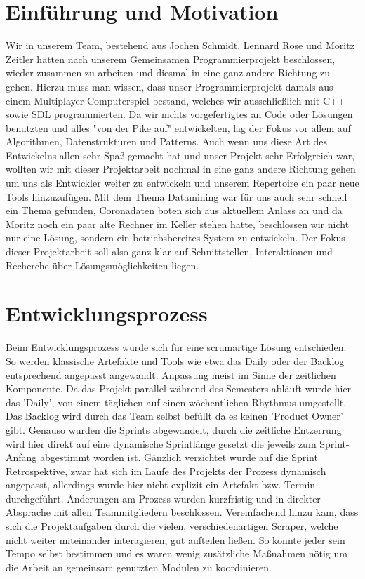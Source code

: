 \documentclass[12pt,oneside,a4paper,parskip]{scrbook}
\begin{document}
\chapter{Einführung und Motivation}\label{ch:intro}
Wir in unserem Team, bestehend aus Jochen Schmidt, Lennard Rose und Moritz Zeitler hatten nach unserem Gemeinsamen Programmierprojekt beschlossen, wieder zusammen zu arbeiten und diesmal in eine ganz andere Richtung zu gehen. Hierzu muss man wissen, dass unser Programmierprojekt damals aus einem Multiplayer-Computerspiel bestand, welches wir ausschließlich mit C++ sowie SDL programmierten. Da wir nichts vorgefertigtes an Code oder Lösungen benutzten und alles "von der Pike auf"  entwickelten, lag der Fokus vor allem auf Algorithmen, Datenstrukturen und Patterns. Auch wenn uns diese Art des Entwickelns allen sehr Spaß gemacht hat und unser Projekt sehr Erfolgreich war, wollten wir mit dieser Projektarbeit nochmal in eine ganz andere Richtung gehen um uns als Entwickler weiter zu entwickeln und unserem Repertoire ein paar neue Tools hinzuzufügen. Mit dem Thema Datamining war für uns auch sehr schnell ein Thema gefunden, Coronadaten boten sich aus aktuellem Anlass an und da Moritz noch ein paar alte Rechner im Keller stehen hatte, beschlossen wir nicht nur eine Lösung, sondern ein betriebsbereites System zu entwickeln. \newline
Der Fokus dieser Projektarbeit soll also ganz klar auf Schnittstellen, Interaktionen und Recherche über Lösungsmöglichkeiten liegen.

\chapter{Entwicklungsprozess}
Beim Entwicklungsprozess wurde sich f\"ur eine scrumartige L\"osung entschieden. So werden klassische Artefakte und Tools wie etwa das Daily oder der Backlog entsprechend angepasst angewandt. Anpassung meist im Sinne der zeitlichen Komponente. Da das Projekt parallel w\"ahrend des Semesters abl\"auft wurde hier das 'Daily', von einem t\"aglichen auf einen w\"ochentlichen Rhythmus umgestellt. Das Backlog wird durch das Team selbst bef\"ullt da es keinen 'Product Owner' gibt. Genauso wurden die Sprints abgewandelt, durch die zeitliche Entzerrung wird hier direkt auf eine dynamische Sprintl\"ange gesetzt die jeweils zum Sprint-Anfang abgestimmt worden ist. \newline
G\"anzlich verzichtet wurde auf die Sprint Retrospektive, zwar hat sich im Laufe des Projekts der Prozess dynamisch angepasst, allerdings wurde hier nicht explizit ein Artefakt bzw. Termin durchgef\"uhrt. \"Anderungen am Prozess wurden kurzfristig und in direkter Absprache mit allen Teammitgliedern beschlossen. Vereinfachend hinzu kam, dass sich die Projektaufgaben durch die vielen, verschiedenartigen Scraper, welche nicht weiter miteinander interagieren, gut aufteilen ließen. So konnte jeder sein Tempo selbst bestimmen und es waren wenig zusätzliche Maßnahmen nötig um die Arbeit an gemeinsam genutzten Modulen zu koordinieren.
\end{document}
